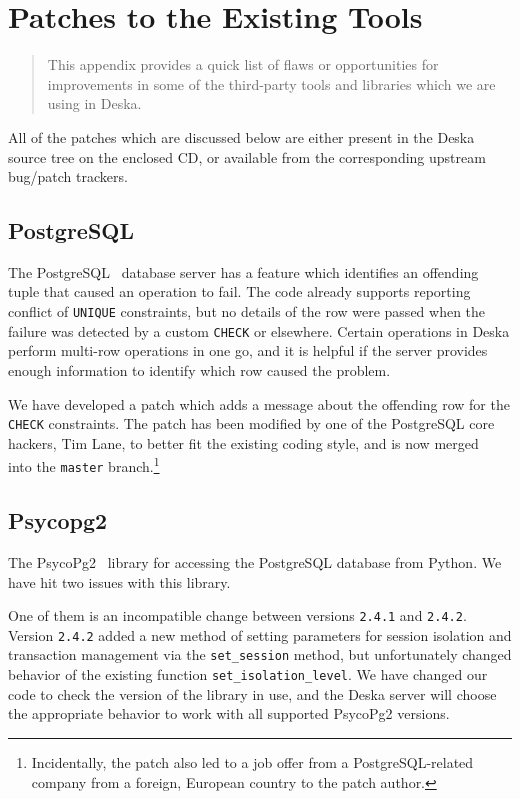 \documentclass[deska]{subfiles}
\begin{document}
\chapter{Patches to the Existing Tools}
\label{sec:patches}

\begin{abstract}
This appendix provides a quick list of flaws or opportunities for improvements in some of the third-party tools and
libraries which we are using in Deska.
\end{abstract}

All of the patches which are discussed below are either present in the Deska source tree on the enclosed CD, or
available from the corresponding upstream bug/patch trackers.

\section{PostgreSQL}

The PostgreSQL~\cite{postgresql} database server has a feature which identifies an offending tuple that caused an
operation to fail.  The code already supports reporting conflict of {\tt UNIQUE} constraints, but no details of the row
were passed when the failure was detected by a custom {\tt CHECK} or elsewhere.  Certain operations in Deska perform
multi-row operations in one go, and it is helpful if the server provides enough information to identify which row caused
the problem.

We have developed a patch which adds a message about the offending row for the {\tt CHECK} constraints.  The patch has
been modified by one of the PostgreSQL core hackers, Tim Lane, to better fit the existing coding style, and is now
merged~\cite{postgresql-check-patch} into the {\tt master} branch.\footnote{Incidentally, the patch also led to a job
offer from a PostgreSQL-related company from a foreign, European country to the patch author.}

\section{Psycopg2}

The PsycoPg2~\cite{psycopg} library for accessing the PostgreSQL database from Python.  We have hit two issues with this
library.

One of them is an incompatible change between versions {\tt 2.4.1} and {\tt 2.4.2}.  Version {\tt 2.4.2} added a new
method of setting parameters for session isolation and transaction management via the {\tt set\_session} method, but
unfortunately changed behavior of the existing function {\tt set\_isolation\_level}.  We have changed our code to check
the version of the library in use, and the Deska server will choose the appropriate behavior to work with all supported
PsycoPg2 versions.
\end{document}
